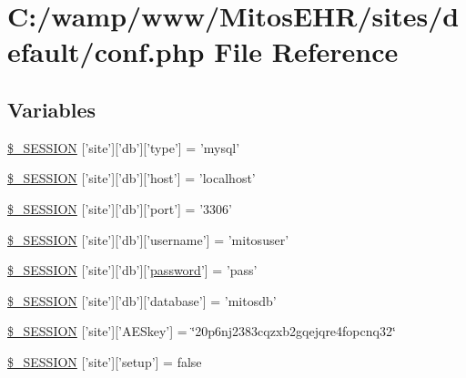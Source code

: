 \hypertarget{sites_2default_2conf_8php}{\section{\-C\-:/wamp/www/\-Mitos\-E\-H\-R/sites/default/conf.php \-File \-Reference}
\label{sites_2default_2conf_8php}
}
\subsection*{\-Variables}
\begin{DoxyCompactItemize}
\item 
\hyperlink{sites_2default_2conf_8php_a3a4fa49ab6dddfa9c346db822685ecbe}{\$\-\_\-\-S\-E\-S\-S\-I\-O\-N} \mbox{[}'site'\mbox{]}\mbox{[}'db'\mbox{]}\mbox{[}'type'\mbox{]} = 'mysql'
\item 
\hyperlink{sites_2default_2conf_8php_aa19fa0436dd2ec0b53315caa21c96832}{\$\-\_\-\-S\-E\-S\-S\-I\-O\-N} \mbox{[}'site'\mbox{]}\mbox{[}'db'\mbox{]}\mbox{[}'host'\mbox{]} = 'localhost'
\item 
\hyperlink{sites_2default_2conf_8php_afa8532c41f4264b9170e9e67f350eb32}{\$\-\_\-\-S\-E\-S\-S\-I\-O\-N} \mbox{[}'site'\mbox{]}\mbox{[}'db'\mbox{]}\mbox{[}'port'\mbox{]} = '3306'
\item 
\hyperlink{sites_2default_2conf_8php_a52abc60f7405711ec86306adcc75bb52}{\$\-\_\-\-S\-E\-S\-S\-I\-O\-N} \mbox{[}'site'\mbox{]}\mbox{[}'db'\mbox{]}\mbox{[}'username'\mbox{]} = 'mitosuser'
\item 
\hyperlink{sites_2default_2conf_8php_add5af83c057b1684ddee38e593f49fe3}{\$\-\_\-\-S\-E\-S\-S\-I\-O\-N} \mbox{[}'site'\mbox{]}\mbox{[}'db'\mbox{]}\mbox{[}'\hyperlink{classpassword}{password}'\mbox{]} = 'pass'
\item 
\hyperlink{sites_2default_2conf_8php_ae6d86271937ef718137778389e84c84d}{\$\-\_\-\-S\-E\-S\-S\-I\-O\-N} \mbox{[}'site'\mbox{]}\mbox{[}'db'\mbox{]}\mbox{[}'database'\mbox{]} = 'mitosdb'
\item 
\hyperlink{sites_2default_2conf_8php_acdbd078321573ede00f1ba490a914deb}{\$\-\_\-\-S\-E\-S\-S\-I\-O\-N} \mbox{[}'site'\mbox{]}\mbox{[}'\-A\-E\-Skey'\mbox{]} = \char`\"{}20p6nj2383cqzxb2gqejqre4fopcnq32\char`\"{}
\item 
\hyperlink{sites_2default_2conf_8php_aecebd34109af039a13c90ba0f51db8fc}{\$\-\_\-\-S\-E\-S\-S\-I\-O\-N} \mbox{[}'site'\mbox{]}\mbox{[}'setup'\mbox{]} = false
\end{DoxyCompactItemize}


